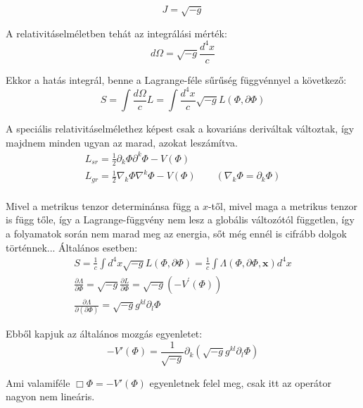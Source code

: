 \documentclass[a4paper,12pt]{article}
\begin{document}
\begin{equation*}
    J = \sqrt{-g}
\end{equation*}
\par A relativitáselméletben tehát az integrálási mérték:
\begin{equation*}
    d\Omega = \sqrt{-g}\frac{d^{4}x}{c}
\end{equation*}
\par Ekkor a hatás integrál, benne a Lagrange-féle sűrűség függvénnyel a következő:
\begin{equation*}
    S = \int \frac{d\Omega}{c}L = \int \frac{d^{4}x}{c}\sqrt{-g}L(\Phi, \partial\Phi)
\end{equation*}
\par A speciális relativitáselmélethez képest csak a kovariáns deriváltak változtak, így majdnem minden ugyan az marad, azokat leszámítva.
\begin{gather*}
    L_{sr} = \frac{1}{2}\partial_{k}\Phi\partial^{k}\Phi - V(\Phi) \\
    L_{gr} = \frac{1}{2}\nabla_{k}\Phi\nabla^{k}\Phi - V(\Phi) \quad \quad (\nabla_{k}\Phi = \partial_{k}\Phi)\\
\end{gather*}
\par Mivel a metrikus tenzor determinánsa függ a $x$-től, mivel maga a metrikus tenzor is függ tőle, így a Lagrange-függvény nem lesz a globális változótól független, így a folyamatok során nem marad meg az energia, sőt még ennél is cifrább dolgok történnek... Általános esetben:
\begin{gather*}
    S = \frac{1}{c} \int d^{4}x\sqrt{-g}L(\Phi, \partial\Phi) = \frac{1}{c} \int \Lambda(\Phi, \partial\Phi, \textbf{x}) d^{4}x \\
    \frac{\partial\Lambda}{\partial\Phi} = \sqrt{-g}\frac{\partial L}{\partial\Phi} = \sqrt{-g}(-V^{\prime}(\Phi)) \\
    \frac{\partial \Lambda}{\partial(\partial\Phi)} = \sqrt{-g}g^{kl}\partial_{l}\Phi
\end{gather*}
\par Ebből kapjuk az általános mozgás egyenletet:
\begin{equation*}
    -V'(\Phi) = \frac{1}{\sqrt{-g}}\partial_{k}(\sqrt{-g}g^{kl}\partial_{l}\Phi)
\end{equation*}
\par Ami valamiféle $\Box\Phi = -V'(\Phi)$ egyenletnek felel meg, csak itt az operátor nagyon nem lineáris.
\end{document}

